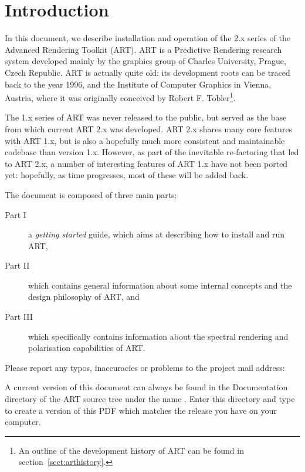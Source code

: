 \section*{Introduction}
\label{sec:introduction}

In this document, we describe installation and operation of
the 2.x series of the Advanced Rendering Toolkit (ART). ART is a
Predictive Rendering research system developed mainly by the graphics group of Charles University, Prague, Czech Republic. ART is actually quite old: its development roots can be traced back to the year 1996, and the Institute of Computer Graphics in Vienna, Austria, where it was originally conceived by Robert F. Tobler\footnote{An outline of the development history of ART can be found in section~\ref{sect:arthistory}.}.

The 1.x series of ART was never released to the public, but served as the base from which current ART 2.x was developed. ART 2.x shares many core features with ART 1.x, but is also a hopefully much more consistent and maintainable codebase than version 1.x. However, as part of the inevitable re-factoring that led to ART 2.x, a number of interesting features of ART 1.x have not been ported yet: hopefully, as time progresses, most of these will be added back.

The document is composed of three main parts: 

\begin{description}
\item[Part I] a \emph{getting started} guide, which aims at describing how to install
  and run ART,
\item[Part II] which contains general information about some internal concepts and the design
philosophy of ART, and
\item[Part III] which specifically contains information about the spectral rendering and polarisation capabilities of ART.
\end{description}


Please report any typos, inaccuracies or problems to the project mail address:\\


A current version of this document can always be found in the Documentation
directory of the ART source tree  under the name
. Enter this directory and type  to create a version of this PDF which matches the release you have on your computer.
